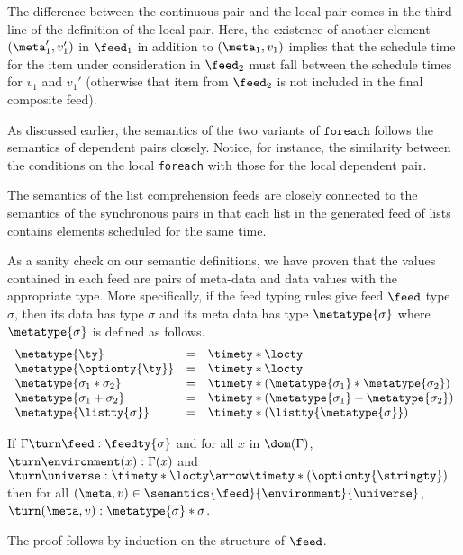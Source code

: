 The difference between the continuous pair and the local pair
comes in the third line of the definition of the local pair.
Here, the existence of another element $(\meta_1',v_1')$
in $\feed_1$ in addition to $(\meta_1,v_1)$ implies that the 
schedule time for the item under consideration in $\feed_2$
must fall between the schedule times for $v_1$ and $v_1'$
(otherwise that item from $\feed_2$ is not included in the
final composite feed). 

As discussed earlier, the semantics of the two variants of $\mathtt{foreach}$
follows the semantics of dependent pairs closely.  Notice, for instance,
the similarity between the conditions on the local {\tt foreach} with those
for the local dependent pair.  

The semantics of the list comprehension feeds are closely connected to the semantics of
the synchronous pairs in that each list in the generated feed of lists contains elements
scheduled for the same time.

As a sanity check on our semantic definitions, we have proven
that the values contained in each feed are pairs of meta-data and data
values with the appropriate type.  More specifically, if the feed typing
rules give feed $\feed$ type $\sigma$, then its data has type $\sigma$ and
its meta data has type $\metatype{\sigma}$ where $\metatype{\sigma}$ is
defined as follows.
\[
\begin {array} {lcl}
\metatype{\ty} & = & \timety * \locty \\
\metatype{\optionty{\ty}} & = & \timety * \locty \\
\metatype{\sigma_1 * \sigma_2} & = & \timety * (\metatype{\sigma_1} * \metatype{\sigma_2}) \\
\metatype{\sigma_1 + \sigma_2} & = & \timety * (\metatype{\sigma_1} + \metatype{\sigma_2}) \\
\metatype{\listty{\sigma}} & = & \timety * (\listty{\metatype{\sigma}}) \\
\end{array}
\]
\begin{theorem}
If $\Gamma \turn \feed : \feedty{\sigma}$ and
for all $x$ in $\dom(\Gamma)$, $\turn \environment(x) : \Gamma(x)$
and $\turn \universe : \timety * \locty \arrow \timety * (\optionty{\stringty})$
then
for all $(\meta,v) \in \semantics{\feed}{\environment}{\universe}$,
$\turn (\meta,v) : \metatype{\sigma} * \sigma$. 
\end{theorem}
The proof follows by induction on the structure of $\feed$.



